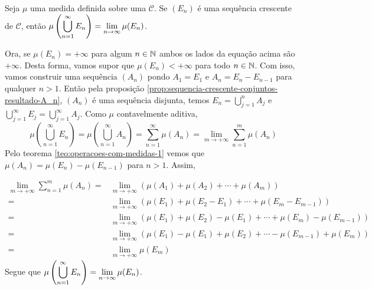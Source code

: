 \begin{proposition}
\label{prop:limite-sequencia-crescente}
Seja $\mu$ uma medida definida sobre uma \sigal $\mathcal{C}$.
Se $(E_n)$ é uma sequência crescente de $\mathcal{C}$, então $\mu\left(\displaystyle \bigcup_{n = 1}^\infty E_n\right) = \displaystyle \lim_{n \to \infty} \mu(E_n)$.
\end{proposition} 

\begin{prova}
    Ora, se $\mu(E_n) = +\infty$ para algum $n \in \operatorname{\mathbb{N}}$ ambos os lados da equação acima são $+\infty$.
    Desta forma, vamos supor que $\mu(E_n) < +\infty$ para todo $n \in \operatorname{\mathbb{N}}$.
    Com isso, vamos construir uma sequência $(A_n)$ pondo $A_1 = E_1$ e $A_n = E_n - E_{n-1}$ para qualquer $n>1$.
    Então pela proposição \ref{prop:sequencia-crescente-conjuntos-resultado-A_n}, $(A_n)$ é uma sequência disjunta, temos $E_n = \bigcup_{j = 1}^n A_j$ e $\bigcup_{j = 1}^\infty E_j = \bigcup_{j = 1}^\infty A_j$.
    Como $\mu$ contavelmente aditiva, 
    $$\mu\left(\bigcup_{n = 1}^\infty E_n\right)
    =\mu\left(\bigcup_{n = 1}^\infty A_n\right)
    = \sum_{n = 1}^\infty \mu(A_n)
    = \lim_{m \to +\infty}\sum_{n = 1}^m \mu(A_n)$$
    Pelo teorema \ref{teo:operacoes-com-medidas-1} vemos que $\mu(A_n) = \mu(E_n) - \mu(E_{n - 1 })$ para $n > 1$.
    Assim, 
    
    \begin{align*}
        \lim_{m \to +\infty}\sum_{n = 1}^m \mu(A_n)
        =&
        \lim_{m \to +\infty}(\mu(A_1) + \mu(A_2) + \cdots +\mu(A_m))\\
        =&
        \lim_{m \to +\infty}(\mu(E_1) + \mu(E_2 - E_1) + \cdots +\mu(E_m - E_{m-1}))\\
        =&
        \lim_{m \to +\infty}(\mu(E_1) + \mu(E_2) - \mu(E_1) + \cdots +\mu(E_m) - \mu(E_{m-1}))\\
        =&
        \lim_{m \to +\infty}(\mu(E_1) - \mu(E_1) + \mu(E_2)  + \cdots  - \mu(E_{m-1}) +\mu(E_m) )\\
        =&
        \lim_{m \to +\infty} \mu(E_m)
    \end{align*}
    Segue que $\mu\left(\displaystyle \bigcup_{n = 1}^\infty E_n\right) = \displaystyle \lim_{n \to \infty} \mu(E_n)$.





    


\end{prova}

